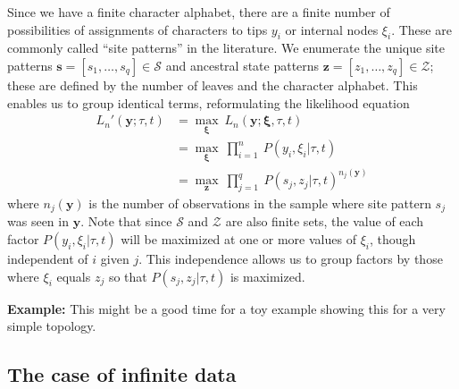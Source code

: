 \documentclass[a4paper]{article}
\begin{document}
Since we have a finite character alphabet, there are a finite number of possibilities of assignments of characters to tips $y_i$ or internal nodes $\xi_i$.
These are commonly called ``site patterns'' in the literature.
We enumerate the unique site patterns $\mathbf{s}=[s_1,\ldots,s_q]\in\mathcal{S}$ and ancestral state patterns $\mathbf{z}=[z_1,\ldots,z_q]\in\mathcal{Z}$; these are defined by the number of leaves and the character alphabet.
This enables us to group identical terms, reformulating the likelihood equation
\begin{align}
L_n'(\mathbf{y};\tau, t) &= \max_{\boldsymbol\xi} \ L_n(\mathbf{y};\boldsymbol\xi, \tau, t) \\
    &= \max_{\boldsymbol\xi} \ \prod_{i=1}^{n} \ P(y_i, \xi_i | \tau, t) \\
    &= \max_{\mathbf{z}} \ \prod_{j=1}^{q} \ P(s_j, z_j | \tau, t)^{n_j(\mathbf{y})} \label{eq:site_pattern_likelihood}
\end{align}
where $n_j(\mathbf{y})$ is the number of observations in the sample where site pattern $s_j$ was seen in $\mathbf{y}$.
Note that since $\mathcal{S}$ and $\mathcal{Z}$ are also finite sets, the value of each factor $P(y_i, \xi_i | \tau, t)$ will be maximized at one or more values of $\xi_i$, though independent of $i$ given $j$.
This independence allows us to group factors by those where $\xi_i$ equals $z_j$ so that $P(s_j, z_j | \tau, t)$ is maximized.

\textbf{Example:} This might be a good time for a toy example showing this for a very simple topology.


\subsection{The case of infinite data}
\end{document}
